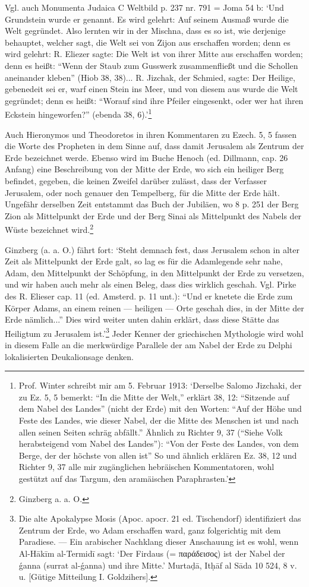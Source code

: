 \documentclass[a4paper, 11pt, oneside]{article}
\begin{document}
Vgl. auch Monumenta Judaica C Weltbild p. 237 nr. 791 = Joma 54 b: `Und Grundstein wurde er genannt. Es wird gelehrt: Auf seinem Ausmaß wurde die Welt gegründet. Also lernten wir in der Mischna, dass es so ist, wie derjenige behauptet, welcher sagt, die Welt sei von Zijon aus erschaffen worden; denn es wird gelehrt: R. Eliezer sagte: Die Welt ist von ihrer Mitte aus erschaffen worden; denn es heißt: "`Wenn der Staub zum Gusswerk zusammenfließt und die Schollen aneinander kleben"' (Hiob 38, 38)... R. Jizchak, der Schmied, sagte: Der Heilige, gebenedeit sei er, warf einen Stein ins Meer, und von diesem aus wurde die Welt gegründet; denn es heißt: "`Worauf sind ihre Pfeiler eingesenkt, oder wer hat ihren Eckstein hingeworfen?"' (ebenda 38, 6).'\footnote{Prof. Winter schreibt mir am 5. Februar 1913: `Derselbe Salomo Jizchaki, der zu Ez. 5, 5 bemerkt: "`In die Mitte der Welt,"' erklärt 38, 12: "`Sitzende auf dem Nabel des Landes"' (nicht der Erde) mit den Worten: "`Auf der Höhe und Feste des Landes, wie dieser Nabel, der die Mitte des Menschen ist und nach allen seinen Seiten schräg abfällt."' Ähnlich zu Richter 9, 37 ("`Siehe Volk herabsteigend vom Nabel des Landes"'): "`Von der Feste des Landes, von dem Berge, der der höchste von allen ist"' So und ähnlich erklären Ez. 38, 12 und Richter 9, 37 alle mir zugänglichen hebräischen Kommentatoren, wohl gestützt auf das Targum, den aramäischen Paraphrasten.'}

Auch Hieronymos und Theodoretos in ihren Kommentaren zu Ezech. 5, 5 fassen die Worte des Propheten in dem Sinne auf, dass damit Jerusalem als Zentrum der Erde bezeichnet werde. Ebenso wird im Buche Henoch (ed. Dillmann, cap. 26 Anfang) eine Beschreibung von der Mitte der Erde, wo sich ein heiliger Berg befindet, gegeben, die keinen Zweifel darüber zulässt, dass der Verfasser Jerusalem, oder noch genauer den Tempelberg, für die Mitte der Erde hält. Ungefähr derselben Zeit entstammt das Buch der Jubiläen, wo 8 p. 251 der Berg Zion als Mittelpunkt der Erde und der Berg Sinai als Mittelpunkt des Nabels der Wüste bezeichnet wird.\footnote{Ginzberg a. a. O.}

Ginzberg (a. a. O.) fährt fort: `Steht demnach fest, dass Jerusalem schon in alter Zeit als Mittelpunkt der Erde galt, so lag es für die Adamlegende sehr nahe, Adam, den Mittelpunkt der Schöpfung, in den Mittelpunkt der Erde zu versetzen, und wir haben auch mehr als einen Beleg, dass dies wirklich geschah. Vgl. Pirke des R. Elieser cap. 11 (ed. Amsterd. p. 11 unt.): "`Und er knetete die Erde zum Körper Adams, an einem reinen --- heiligen --- Orte geschah dies, in der Mitte der Erde nämlich..."' Dies wird weiter unten dahin erklärt, dass diese Stätte das Heiligtum zu Jerusalem ist.'\footnote{Die alte Apokalypse Mosis (Apoc. apocr. 21 ed. Tischendorf) identifiziert das Zentrum der Erde, wo Adam erschaffen ward, ganz folgerichtig mit dem Paradiese. --- Ein arabischer Nachklang dieser Anschauung ist es wohl, wenn Al-Hākīm al-Termidī sagt: `Der Firdaus (= παράδεισος) ist der Nabel der ǵanna (surrat al-ǵanna) und ihre Mitte.' Murtaḍā, Itḥāf al Sāda 10 524, 8 v. u. [Gütige Mitteilung I. Goldzihers].} Jeder Kenner der griechischen Mythologie wird wohl in diesem Falle an die merkwürdige Parallele der am Nabel der Erde zu Delphi lokalisierten Deukalionsage denken.
\end{document}

